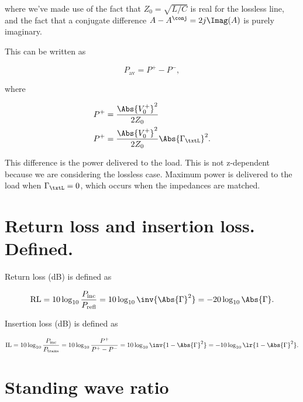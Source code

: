 where we've made use of the fact that \( Z_0 = \sqrt{L/C} \) is real for the lossless line, and the fact that a conjugate difference \( A - A^\conj = 2 j \Imag(A) \) is purely imaginary.

This can be written as

\begin{dmath}\label{eqn:uwaves4TransmissionLines:1020}
P_{ \textrm{av}} = P^{+} - P^{-},
\end{dmath}

where

\begin{equation}\label{eqn:uwaves4TransmissionLines:1040}
\begin{aligned}
P^{+} &= \frac{ \Abs{V_0^{+}}^2 }{2 Z_0 } \\
P^{+} &= \frac{ \Abs{V_0^{+}}^2 }{2 Z_0 } \Abs{\Gamma_\txtL}^2.
\end{aligned}
\end{equation}

This difference is the power delivered to the load.  This is not z-dependent because we are considering the lossless case.  Maximum power is delivered to the load when \( \Gamma_\txtL = 0 \), which occurs when the impedances are matched.

\section{Return loss and insertion loss.  Defined.}

Return loss (dB) is defined as

\begin{dmath}\label{eqn:uwaves4TransmissionLines:1060}
\textrm{RL}
= 10 \log_{10} \frac{P_{\textrm{inc}}}{P_{\textrm{refl}}}
= 10 \log_{10} \inv{\Abs{\Gamma}^2}
= -20 \log_{10} \Abs{\Gamma}.
\end{dmath}

Insertion loss (dB) is defined as

\begin{dmath}\label{eqn:uwaves4TransmissionLines:1080}
\textrm{IL}
= 10 \log_{10} \frac{P_{\textrm{inc}}}{P_{\textrm{trans}}}
= 10 \log_{10} \frac{P^{+}}{P^{+} - P^{-}}
= 10 \log_{10} \inv{1 - \Abs{\Gamma}^2}
= -10 \log_{10} \lr{ 1 - \Abs{\Gamma}^2 }.
\end{dmath}

\section{Standing wave ratio}

